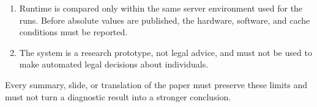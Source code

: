 \begin{enumerate}
    \item Runtime is compared only within the same server environment used
    for the runs. Before absolute values are published, the hardware,
    software, and cache conditions must be reported.

    \item The system is a research prototype, not legal advice, and must not
    be used to make automated legal decisions about individuals.
\end{enumerate}

Every summary, slide, or translation of the paper must preserve these limits
and must not turn a diagnostic result into a stronger conclusion.

